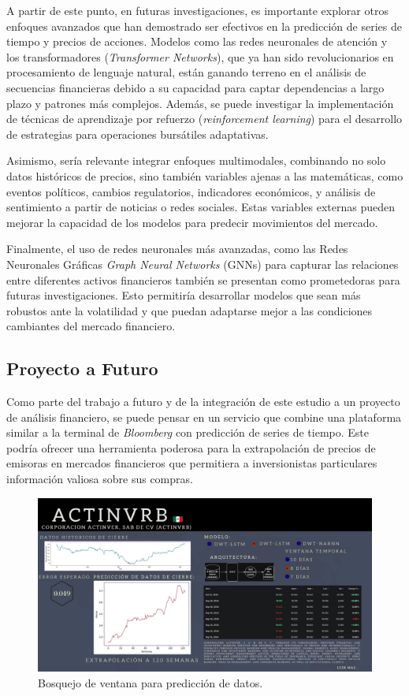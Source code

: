 A partir de este punto, en futuras investigaciones, es importante explorar otros enfoques avanzados que han demostrado ser efectivos en la predicción de series de tiempo y precios de acciones. Modelos como las redes neuronales de atención y los transformadores (\textit{Transformer Networks}), que ya han sido revolucionarios en procesamiento de lenguaje natural, están ganando terreno en el análisis de secuencias financieras debido a su capacidad para captar dependencias a largo plazo y patrones más complejos. Además, se puede investigar la implementación de técnicas de aprendizaje por refuerzo (\textit{reinforcement learning}) para el desarrollo de estrategias para operaciones bursátiles adaptativas.

Asimismo, sería relevante integrar enfoques multimodales, combinando no solo datos históricos de precios, sino también variables ajenas a las matemáticas, como eventos políticos, cambios regulatorios, indicadores económicos, y análisis de sentimiento a partir de noticias o redes sociales. Estas variables externas pueden mejorar la capacidad de los modelos para predecir movimientos del mercado.

Finalmente, el uso de redes neuronales más avanzadas, como las Redes Neuronales Gráficas \textit{Graph Neural Networks} (GNNs) \cite{graphNN} para capturar las relaciones entre diferentes activos financieros también se presentan como prometedoras para futuras investigaciones. Esto permitiría desarrollar modelos que sean más robustos ante la volatilidad y que puedan adaptarse mejor a las condiciones cambiantes del mercado financiero.

\subsection{Proyecto a Futuro}

Como parte del trabajo a futuro y de la integración de este estudio a un proyecto de análisis financiero, se puede pensar en un servicio que combine una plataforma similar a la terminal de \textit{Bloomberg} con predicción de series de tiempo. Este podría ofrecer una herramienta poderosa para la extrapolación de precios de emisoras en mercados financieros que permitiera a inversionistas particulares información valiosa sobre sus compras.

\begin{figure}[H]
    \centering
    \includegraphics[width=1\textwidth]{Figuras/conclusiones/modelo_app.png}
    \caption{Bosquejo de ventana para predicción de datos.} 
    \label{fig:aplicacion}
\end{figure}

